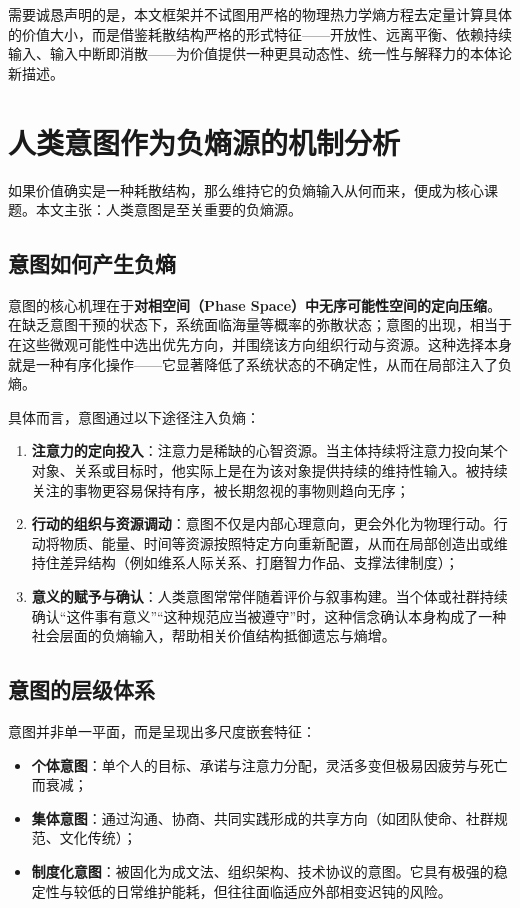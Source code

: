 \documentclass[11pt,a4paper]{ctexart}
\begin{document}
需要诚恳声明的是，本文框架并不试图用严格的物理热力学熵方程去定量计算具体的价值大小，而是借鉴耗散结构严格的形式特征——开放性、远离平衡、依赖持续输入、输入中断即消散——为价值提供一种更具动态性、统一性与解释力的本体论新描述。

\section{人类意图作为负熵源的机制分析}

如果价值确实是一种耗散结构，那么维持它的负熵输入从何而来，便成为核心课题。本文主张：人类意图是至关重要的负熵源。

\subsection{意图如何产生负熵}
意图的核心机理在于\textbf{对相空间（Phase Space）中无序可能性空间的定向压缩}。在缺乏意图干预的状态下，系统面临海量等概率的弥散状态；意图的出现，相当于在这些微观可能性中选出优先方向，并围绕该方向组织行动与资源。这种选择本身就是一种有序化操作——它显著降低了系统状态的不确定性，从而在局部注入了负熵。

具体而言，意图通过以下途径注入负熵：
\begin{enumerate}
    \item \textbf{注意力的定向投入}：注意力是稀缺的心智资源。当主体持续将注意力投向某个对象、关系或目标时，他实际上是在为该对象提供持续的维持性输入。被持续关注的事物更容易保持有序，被长期忽视的事物则趋向无序；
    \item \textbf{行动的组织与资源调动}：意图不仅是内部心理意向，更会外化为物理行动。行动将物质、能量、时间等资源按照特定方向重新配置，从而在局部创造出或维持住差异结构（例如维系人际关系、打磨智力作品、支撑法律制度）；
    \item \textbf{意义的赋予与确认}：人类意图常常伴随着评价与叙事构建。当个体或社群持续确认“这件事有意义”“这种规范应当被遵守”时，这种信念确认本身构成了一种社会层面的负熵输入，帮助相关价值结构抵御遗忘与熵增。
\end{enumerate}

\subsection{意图的层级体系}
意图并非单一平面，而是呈现出多尺度嵌套特征：
\begin{itemize}
    \item \textbf{个体意图}：单个人的目标、承诺与注意力分配，灵活多变但极易因疲劳与死亡而衰减；
    \item \textbf{集体意图}：通过沟通、协商、共同实践形成的共享方向（如团队使命、社群规范、文化传统）；
    \item \textbf{制度化意图}：被固化为成文法、组织架构、技术协议的意图。它具有极强的稳定性与较低的日常维护能耗，但往往面临适应外部相变迟钝的风险。
\end{itemize}
\end{document}
